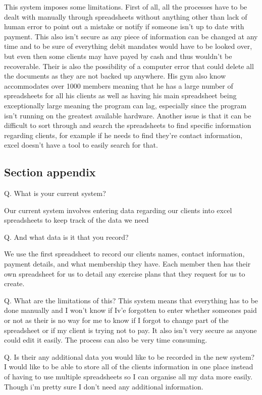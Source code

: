 This system imposes some limitations. First of all, all the processes have to be dealt with manually through spreadsheets without anything other than lack of human error to point out a mistake or notify if someone isn't up to date with payment. This also isn't secure as any piece of information can be changed at any time and to be sure of everything debit mandates would have to be looked over, but even then some clients may have payed by cash and thus wouldn't be recoverable. Their is also the possibility of a computer error that could delete all the documents as they are not backed up anywhere. His gym also know accommodates over 1000 members meaning that he has a large number of spreadsheets for all his clients as well as having his main spreadsheet being exceptionally large meaning the program can lag, especially since the program isn't running on the greatest available hardware. Another issue is that it can be difficult to sort through and search the spreadsheets to find specific information regarding clients, for example if he needs to find they're contact information, excel doesn't have a tool to easily search for that.

\subsection{Section appendix}

Q. What is your current system?

Our current system involves entering data regarding our clients into excel spreadsheets to keep track of the data we need

Q. And what data is it that you record?

We use the first spreadsheet to record our clients names, contact information, payment details, and what membership they have. Each member then has their own spreadsheet for us to detail any exercise plans that they request for us to create. 

Q. What are the limitations of this?
This system means that everything has to be done manually and I won't know if Iv'e forgotten to enter whether someones paid or not as their is no way for me to know if I forgot to change part of the spreadsheet or if my client is trying not to pay. It also isn't very secure as anyone could edit it easily. The process can also be very time consuming.

Q. Is their any additional data you would like to be recorded in the new system?
I would like to be able to store all of the clients information in one place instead of having to use multiple spreadsheets so I can organise all my data more easily. Though i'm pretty sure I don't need any additional information.


